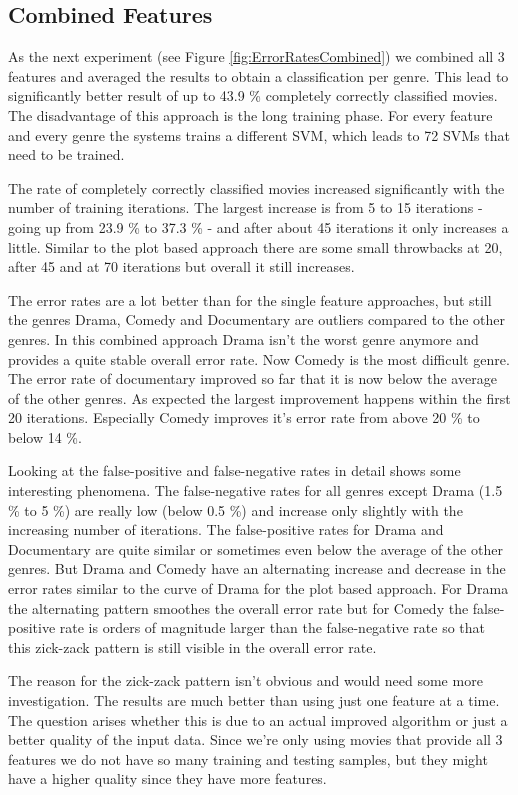 \documentclass{vldb}
\begin{document}
\subsection{Combined Features}
\par As the next experiment (see Figure \ref{fig:ErrorRatesCombined})  we combined all 3 features and averaged the results to obtain a classification per genre. This lead to significantly better result of up to 43.9 \% completely correctly classified movies. The disadvantage of this approach is the long training phase. For every feature and every genre the systems trains a different SVM, which leads to 72 SVMs that need to be trained.
\par The rate of completely correctly classified movies increased significantly with the number of training iterations. The largest increase is from 5 to 15 iterations - going up from 23.9 \% to 37.3 \% - and after about 45 iterations it only increases a little. Similar to the plot based approach there are some small throwbacks at 20, after 45 and at 70 iterations but overall it still increases.
\par The error rates are a lot better than for the single feature approaches, but still the genres Drama, Comedy and Documentary are outliers compared to the other genres. In this combined approach Drama isn't the worst genre anymore and provides a quite stable overall error rate. Now Comedy is the most difficult genre. The error rate of documentary improved so far that it is now below the average of the other genres. As expected the largest improvement happens within the first 20 iterations. Especially Comedy improves it's error rate from above 20 \% to below 14 \%.
\par Looking at the false-positive and false-negative rates in detail shows some interesting phenomena. The false-negative rates for all genres except Drama (1.5 \% to 5 \%) are really low (below 0.5 \%) and increase only slightly with the increasing number of iterations. The false-positive rates for Drama and Documentary are quite similar or sometimes even below the average of the other genres. But Drama and Comedy have an alternating increase and decrease in the error rates similar to the curve of Drama for the plot based approach. For Drama the alternating pattern smoothes the overall error rate but for Comedy the false-positive rate is orders of magnitude larger than the false-negative rate so that this zick-zack pattern is still visible in the overall error rate.
\par The reason for the zick-zack pattern isn't obvious and would need some more investigation. The results are much better than using just one feature at a time. The question arises whether this is due to an actual improved algorithm or just a better quality of the input data. Since we're only using movies that provide all 3 features we do not have so many training and testing samples, but they might have a higher quality since they have more features.
\end{document}
